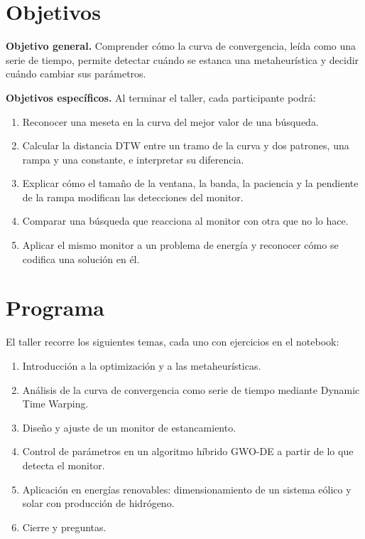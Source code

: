 \documentclass[11pt]{article}
\begin{document}
\section{Objetivos}

\textbf{Objetivo general.} Comprender cómo la curva de convergencia, leída como una serie de tiempo, permite detectar cuándo se estanca una metaheurística y decidir cuándo cambiar sus parámetros.

\textbf{Objetivos específicos.} Al terminar el taller, cada participante podrá:
\begin{enumerate}
  \item Reconocer una meseta en la curva del mejor valor de una búsqueda.
  \item Calcular la distancia DTW entre un tramo de la curva y dos patrones, una rampa y una constante, e interpretar su diferencia.
  \item Explicar cómo el tamaño de la ventana, la banda, la paciencia y la pendiente de la rampa modifican las detecciones del monitor.
  \item Comparar una búsqueda que reacciona al monitor con otra que no lo hace.
  \item Aplicar el mismo monitor a un problema de energía y reconocer cómo se codifica una solución en él.
\end{enumerate}

\section{Programa}

El taller recorre los siguientes temas, cada uno con ejercicios en el notebook:

\begin{enumerate}
  \item Introducción a la optimización y a las metaheurísticas.
  \item Análisis de la curva de convergencia como serie de tiempo mediante Dynamic Time Warping.
  \item Diseño y ajuste de un monitor de estancamiento.
  \item Control de parámetros en un algoritmo híbrido GWO-DE a partir de lo que detecta el monitor.
  \item Aplicación en energías renovables: dimensionamiento de un sistema eólico y solar con producción de hidrógeno.
  \item Cierre y preguntas.
\end{enumerate}
\end{document}
